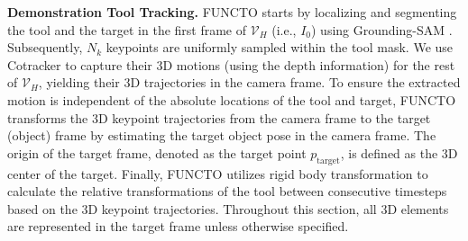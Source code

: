 \noindent \textbf{Demonstration Tool Tracking.} FUNCTO starts by localizing and segmenting the tool and the target in the first frame of $\mathcal{V}_H$ (i.e., $I_0$) using Grounding-SAM \cite{ren2024grounded}. Subsequently, $N_k$ keypoints are uniformly sampled within the tool mask. We use Cotracker \cite{karaev2025cotracker} to capture their 3D motions (using the depth information) for the rest of $\mathcal{V}_H$, yielding their 3D trajectories in the camera frame. To ensure the extracted motion is independent of the absolute locations of the tool and target, FUNCTO transforms the 3D keypoint trajectories from the camera frame to the target (object) frame by estimating the target object pose in the camera frame. The origin of the target frame, denoted as the target point $p_{\text{target}}$, is defined as the 3D center of the target. Finally, FUNCTO utilizes rigid body transformation \cite{bottema1990theoretical} to calculate the relative transformations of the tool between consecutive timesteps based on the 3D keypoint trajectories. Throughout this section, all 3D elements are represented in the target frame unless otherwise specified.  \\


